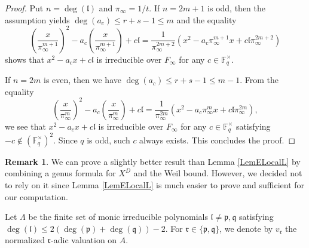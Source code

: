\documentclass[10pt]{amsart}
\theoremstyle{plain}
\theoremstyle{definition}
\newtheorem{rmk}[thm]{Remark}
\newcommand{\bF}{\mathbb{F}}
\newcommand{\frl}{\mathfrak{l}}
\newcommand{\frp}{\mathfrak{p}}
\newcommand{\frq}{\mathfrak{q}}
\newcommand{\frr}{\mathfrak{r}}
\begin{document}
\begin{proof}
	Put $n=\deg(\frl)$ and $\pi_\infty=1/t$. If $n=2m+1$ is odd, then the assumption yields
	$\deg(a_c)\leq r+s-1 \leq m$ and the equality
	\[
	\left(\frac{x}{\pi_\infty^{m+1}}\right)^2-a_c \left(\frac{x}{\pi_\infty^{m+1}}\right)+c\frl=
	\frac{1}{\pi_\infty^{2m+2}}(x^2-a_c \pi_\infty^{m+1} x+c\frl \pi_\infty^{2m+2})
	\]
	shows that $x^2-a_cx+c\frl$ is irreducible over $F_\infty$ for any $c\in \bF_q^\times$.
	
	If $n=2m$ is even, then we have $\deg(a_c)\leq r+s-1 \leq m-1$.
	From the equality
	\[
	\left(\frac{x}{\pi_\infty^{m}}\right)^2-a_c \left(\frac{x}{\pi_\infty^{m}}\right)+c\frl=
	\frac{1}{\pi_\infty^{2m}}(x^2-a_c \pi_\infty^{m} x+c\frl \pi_\infty^{2m}),
	\]
	we see that $x^2-a_cx+c\frl$ is irreducible over $F_\infty$ for any $c\in \bF_q^\times$ satisfying
	$-c\notin (\bF_q^\times)^2$. Since $q$ is odd, such $c$ always exists.
	This concludes the proof.
\end{proof}
\begin{rmk}
	We can prove a slightly better result than Lemma \ref{LemELocalL} 
	by combining a genus formula for $X^D$ \cite[Theorem 5.4]{Pap_gen} and the Weil bound. 
	However, we decided not to rely 
	on it since Lemma \ref{LemELocalL} is much easier to prove and sufficient for our computation.
\end{rmk}

Let $\Lambda$ be the finite set of monic irreducible polynomials $\frl\neq \frp,\frq$
satisfying $\deg(\frl)\leq 2(\deg(\frp)+\deg(\frq))-2$. 
For $\frr\in\{\frp,\frq\}$, we denote by $v_\frr$ the normalized $\frr$-adic valuation on $A$.
\end{document}
